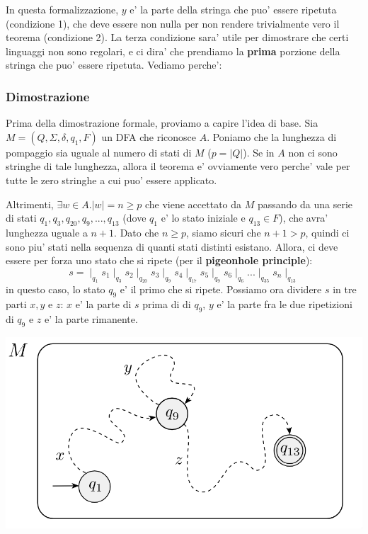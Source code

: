 In questa formalizzazione, $ y $ e' la parte della stringa che puo' essere ripetuta (condizione 1), che deve essere non nulla per non rendere trivialmente vero il teorema (condizione 2). La terza condizione sara' utile per dimostrare che certi linguaggi non sono regolari, e ci dira' che prendiamo la \textbf{prima} porzione della stringa che puo' essere ripetuta. Vediamo perche':

\subsubsection{Dimostrazione}
Prima della dimostrazione formale, proviamo a capire l'idea di base. Sia $ M = (Q, \Sigma, \delta, q_1, F) $ un DFA che riconosce $ A $. Poniamo che la lunghezza di pompaggio sia uguale al numero di stati di $ M $ ($ p = |Q| $). Se in $ A $ non ci sono stringhe di tale lunghezza, allora il teorema e' ovviamente vero perche' vale per tutte le zero stringhe a cui puo' essere applicato.

Altrimenti, $ \exists w \in A. |w| = n \geq p $ che viene accettato da $ M $ passando da una serie di stati $ q_1, q_3, q_{20}, q_9, ..., q_{13} $ (dove $ q_1 $ e' lo stato iniziale e $ q_{13} \in F $), che avra' lunghezza uguale a $ n+1 $. Dato che $ n \geq p $, siamo sicuri che $ n+1 > p $, quindi ci sono piu' stati nella sequenza di quanti stati distinti esistano. Allora, ci deve essere per forza uno stato che si ripete (per il \textbf{pigeonhole principle}):
\[
s = \mid_{q_1} s_1  \mid_{q_3} s_2 \mid_{q_{20}} s_3 \mid_{q_9} s_4 \mid_{q_{17}} s_5 \mid_{q_9} s_6 \mid_{q_6} ... \mid_{q_{35}} s_n \mid_{q_{13}}
\]
in questo caso, lo stato $ q_9 $ e' il primo che si ripete. Possiamo ora dividere $ s $ in tre parti $ x, y $ e $ z $: $ x $ e' la parte di $ s $ prima di di $ q_9 $, $ y $ e' la parte fra le due ripetizioni di $ q_9 $ e $ z $ e' la parte rimanente. 

\begin{center}
  \includegraphics[scale=0.3]{img/2024-12-08-17-37-33.png}
\end{center}

